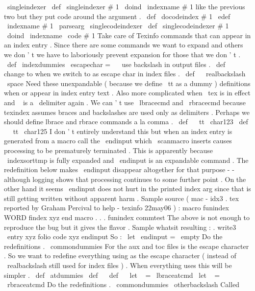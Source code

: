 {{{{\
singleindexer
}
\
def
\
singleindexer
#
1
{
\
doind
{
\
indexname
}
{
#
1
}
}
%
like
the
previous
two
but
they
put
code
around
the
argument
.
\
def
\
docodeindex
#
1
{
\
edef
\
indexname
{
#
1
}
\
parsearg
\
singlecodeindexer
}
\
def
\
singlecodeindexer
#
1
{
\
doind
{
\
indexname
}
{
\
code
{
#
1
}
}
}
%
Take
care
of
Texinfo
commands
that
can
appear
in
an
index
entry
.
%
Since
there
are
some
commands
we
want
to
expand
and
others
we
don
'
t
%
we
have
to
laboriously
prevent
expansion
for
those
that
we
don
'
t
.
%
\
def
\
indexdummies
{
%
\
escapechar
=
\
\
%
use
backslash
in
output
files
.
\
def
\
{
}
%
change
to
when
we
switch
to
as
escape
char
in
index
files
.
\
def
\
{
\
realbackslash
\
space
}
%
%
%
Need
these
unexpandable
(
because
we
define
\
tt
as
a
dummy
)
%
definitions
when
{
or
}
appear
in
index
entry
text
.
Also
more
%
complicated
when
\
tex
is
in
effect
and
\
{
is
a
\
delimiter
again
.
%
We
can
'
t
use
\
lbracecmd
and
\
rbracecmd
because
texindex
assumes
%
braces
and
backslashes
are
used
only
as
delimiters
.
Perhaps
we
%
should
define
lbrace
and
rbrace
commands
a
la
comma
.
\
def
\
{
{
{
\
tt
\
char123
}
}
%
\
def
\
}
{
{
\
tt
\
char125
}
}
%
%
%
I
don
'
t
entirely
understand
this
but
when
an
index
entry
is
%
generated
from
a
macro
call
the
\
endinput
which
\
scanmacro
inserts
%
causes
processing
to
be
prematurely
terminated
.
This
is
%
apparently
because
\
indexsorttmp
is
fully
expanded
and
\
endinput
%
is
an
expandable
command
.
The
redefinition
below
makes
\
endinput
%
disappear
altogether
for
that
purpose
-
-
although
logging
shows
that
%
processing
continues
to
some
further
point
.
On
the
other
hand
it
%
seems
\
endinput
does
not
hurt
in
the
printed
index
arg
since
that
%
is
still
getting
written
without
apparent
harm
.
%
%
Sample
source
(
mac
-
idx3
.
tex
reported
by
Graham
Percival
to
%
help
-
texinfo
22may06
)
:
%
macro
funindex
{
WORD
}
%
findex
xyz
%
end
macro
%
.
.
.
%
funindex
commtest
%
%
The
above
is
not
enough
to
reproduce
the
bug
but
it
gives
the
flavor
.
%
%
Sample
whatsit
resulting
:
%
.
write3
{
\
entry
{
xyz
}
{
folio
}
{
code
{
xyz
endinput
}
}
}
%
%
So
:
\
let
\
endinput
=
\
empty
%
%
Do
the
redefinitions
.
\
commondummies
}
%
For
the
aux
and
toc
files
is
the
escape
character
.
So
we
want
to
%
redefine
everything
using
as
the
escape
character
(
instead
of
%
\
realbackslash
still
used
for
index
files
)
.
When
everything
uses
%
this
will
be
simpler
.
%
\
def
\
atdummies
{
%
\
def
\
{
}
%
\
def
\
{
}
%
\
let
\
{
=
\
lbraceatcmd
\
let
\
}
=
\
rbraceatcmd
%
%
Do
the
redefinitions
.
\
commondummies
\
otherbackslash
}
%
Called
}}}}
